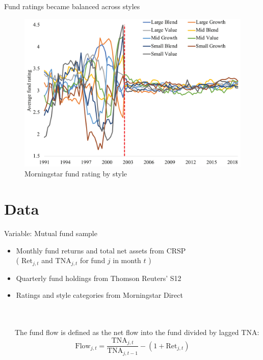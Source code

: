 \documentclass[UTF8, 16pt]{beamer}
\begin{document}
\begin{CJK*}{UTF8}{gbsn}
\begin{frame}{Fund ratings became balanced across styles}
	\begin{figure}[htpb] 
        \begin{center}
            \includegraphics[width=0.85 \linewidth]{pic/fund_rating_by_style.png}
        \end{center}
        \caption{Morningstar fund rating by style}
    \end{figure}
\end{frame}

\section{Data}

\begin{frame}{Variable: Mutual fund sample}
	\begin{itemize}
		\item Monthly fund returns and total net assets from CRSP \\ ( $\mathrm{Ret}_{j, t}$ and $\mathrm{TNA}_{j, t}$ for fund $j$ in month $t$ )
		\item Quarterly fund holdings from Thomson Reuters’ S12
		\item Ratings and style categories from Morningstar Direct
	\end{itemize}
	\\ \ \\
	\ \ \ The \alert{fund flow} is defined as the net flow into the fund divided by lagged TNA:
	$$
	\mathrm{Flow}_{j, t}=\frac{\mathrm{TNA}_{j, t}}{\mathrm{TNA}_{j, t-1}}-\left(1+\mathrm{Ret}_{j, t}\right)
	$$
\end{frame}


\end{CJK*}
\end{document}
